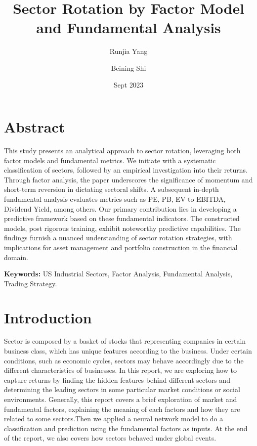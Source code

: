 \documentclass{article}
\title{Sector Rotation by Factor Model and Fundamental Analysis}
\author[1]{Runjia Yang}
\affil[1]{University of California, Davis}
\author[2]{Beining Shi}
\affil[2]{University of California, Davis}
\date{Sept 2023}
\begin{document}
\maketitle

\section*{Abstract}
This study presents an analytical approach to sector rotation, leveraging both factor models and fundamental metrics. We initiate with a systematic classification of sectors, followed by an empirical investigation into their returns. Through factor analysis, the paper underscores the significance of momentum and short-term reversion in dictating sectoral shifts. A subsequent in-depth fundamental analysis evaluates metrics such as PE, PB, EV-to-EBITDA, Dividend Yield, among others. Our primary contribution lies in developing a predictive framework based on these fundamental indicators. The constructed models, post rigorous training, exhibit noteworthy predictive capabilities. The findings furnish a nuanced understanding of sector rotation strategies, with implications for asset management and portfolio construction in the financial domain.

\vspace{4mm}
\noindent
{\bf Keywords:} US Industrial Sectors, Factor Analysis, Fundamental Analysis, Trading Strategy.

\section{Introduction}
Sector is composed by a basket of stocks that representing companies in certain business class, which has unique features according to the business. Under certain conditions, such as economic cycles, sectors may behave accordingly due to the different characteristics of businesses. In this report, we are exploring how to capture returns by finding the hidden features behind different sectors and determining the leading sectors in some particular market conditions or social environments. Generally, this report covers a brief exploration of market and fundamental factors, explaining the meaning of each factors and how they are related to some sectors.Then we applied a neural network model to do a classification and prediction using the fundamental factors as inputs. At the end of the report, we also covers how sectors behaved under global events.
\end{document}
